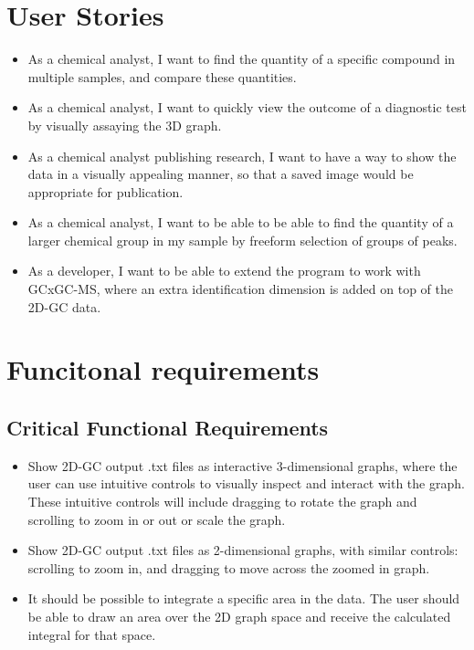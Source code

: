 \documentclass{article}
\begin{document}
\section{User Stories}
\begin{itemize}
	\item As a chemical analyst, I want to find the quantity of a specific compound in multiple samples, and compare these quantities. 
	\item As a chemical analyst, I want to quickly view the outcome of a diagnostic test by visually assaying the 3D graph. 
	\item As a chemical analyst publishing research, I want to have a way to show the data in a visually appealing manner, so that a saved image would be appropriate for publication. 
	\item As a chemical analyst, I want to be able to be able to find the quantity of a larger chemical group in my sample by freeform selection of groups of peaks. 
	\item As a developer, I want to be able to extend the program to work with GCxGC-MS, where an extra identification dimension is added on top of the 2D-GC data. 
\end{itemize}

\section{Funcitonal requirements}
\subsection*{Critical Functional Requirements}
\begin{itemize}
	\item Show 2D-GC output .txt files as interactive 3-dimensional graphs, where the user can use intuitive controls to visually inspect and interact with the graph. These intuitive controls will include dragging to rotate the graph and scrolling to zoom in or out or scale the graph. 
	\item Show 2D-GC output .txt files as 2-dimensional graphs, with similar controls: scrolling to zoom in, and dragging to move across the zoomed in graph. 
    \item It should be possible to integrate a specific area in the data. The user should be able to draw an area over the 2D graph space and receive the calculated integral for that space. 
\end{itemize}
\end{document}
